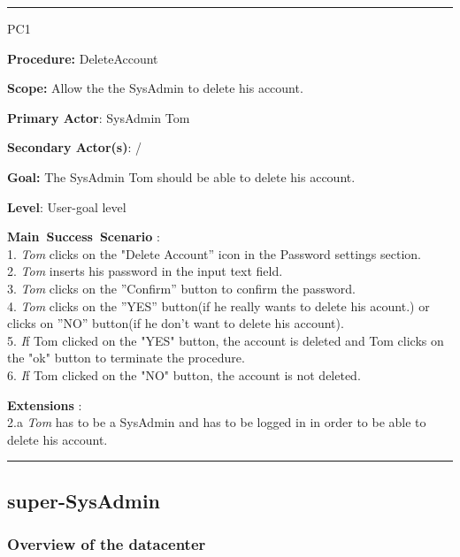 \hrule
\vspace{0.5cm}
\begin{lyxlist}{PC1}
\small{
\item [\textbf{Procedure:}] DeleteAccount 
\item [\textbf{Scope:}] Allow the the SysAdmin to delete his account.
\item [\textbf{Primary Actor}:] SysAdmin Tom
\item [\textbf{Secondary Actor(s)}:] /
\item [\textbf{Goal:}] The SysAdmin Tom should be able to delete his account.
\item [\textbf{Level}:] User-goal level
\item [\textbf{Main~Success~Scenario}]:\\
1. \emph{Tom} clicks on the "Delete Account'' icon in the Password settings
section.\\
2. \emph{Tom} inserts his password in the input text field.\\
3. \emph{Tom} clicks on the ''Confirm'' button to confirm the password.\\
4. \emph{Tom} clicks on the ''YES'' button(if he really wants to delete his
acount.) or clicks on ''NO'' button(if he don't want to delete his account).\\
5. \emph If {Tom} clicked on the "YES" button, the account is deleted and
{Tom} clicks on the "ok" button to terminate the procedure.\\
6. \emph If {Tom} clicked on the "NO" button, the account is not deleted.\\

\item [\textbf{Extensions}]:\\
2.a \emph{Tom} has to be a SysAdmin and has to be logged in in order to be able
to delete his account.\\
}
\end{lyxlist}
\hrule




\subsection{super-SysAdmin}

\subsubsection{Overview of the datacenter}

